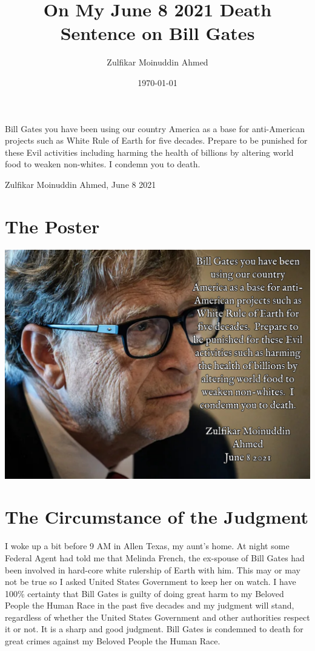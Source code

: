 \documentclass{amsart}
\title{On My June 8 2021 Death Sentence on Bill Gates}
\author{Zulfikar Moinuddin Ahmed}
\date{\today}
\begin{document}
\maketitle
\epigraph{Bill Gates you have been using our country America as a base for anti-American projects such as White Rule of Earth for five decades.  Prepare to be punished for these Evil activities including harming the health of billions by altering world food to weaken non-whites.  I condemn you to death.}{Zulfikar Moinuddin Ahmed, June 8 2021}
\section{The Poster}

\includegraphics[scale=0.1]{judgment.jpg}

\section{The Circumstance of the Judgment}

I woke up a bit before 9 AM in Allen Texas, my aunt's home.  At night some Federal Agent had told me that Melinda French, the ex-spouse of Bill Gates had been involved in hard-core white rulership of Earth with him.  This may or may not be true so I asked United States Government to keep her on watch. I have 100\% certainty that Bill Gates is guilty of doing great harm to my Beloved People the Human Race in the past five decades and my judgment will stand, regardless of whether the United States Government and other authorities respect it or not.  It is a sharp and good judgment.  Bill Gates is condemned to death for great crimes against my Beloved People the Human Race.
\end{document}
